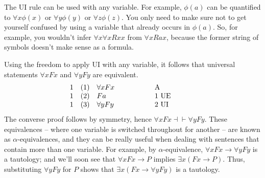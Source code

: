 

The UI rule can be used with any variable.  For example, $\phi (a)$
can be quantified to $\forall x\phi (x)$ or $\forall y\phi (y)$ or
$\forall z\phi (z)$.  You only need to make sure not to get yourself
confused by using a variable that already occurs in $\phi (a)$.  So,
for example, you wouldn't infer $\forall x\forall xRxx$ from
$\forall xRax$, because the former string of symbols doesn't make
sense as a formula.

Using the freedom to apply UI with any variable, it follows that
universal statements $\forall xFx$ and $\forall yFy$ are equivalent.
\[ \begin{array}{l l >{$}p{2.5cm}<{$} p{2cm}}
     1 & (1) & \forall xFx & A\\
     1 & (2) & Fa          & 1 UE \\
     1 & (3) & \forall yFy & 2 UI \end{array} \] The converse proof
 follows by symmetry, hence $\forall xFx\dashv\vdash \forall yFy$.
 These equivalences -- where one variable is switched throughout for
 another -- are known as $\alpha$-equivalences, and they can be really
 useful when dealing with sentences that contain more than one
 variable.  For example, by $\alpha$-equivalence, $\forall xFx\to
 \forall yFy$ is a tautology; and we'll soon see that $\forall xFx\to
 P$ implies $\exists x(Fx\to P)$.  Thus, substituting $\forall
 yFy$ for $P$ shows that $\exists x(Fx\to \forall yFy)$ is a tautology.


